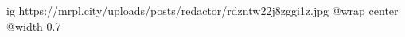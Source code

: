  
 
 
 
 

\ifcmt
  ig https://mrpl.city/uploads/posts/redactor/rdzntw22j8zggi1z.jpg
  @wrap center
  @width 0.7
\fi
